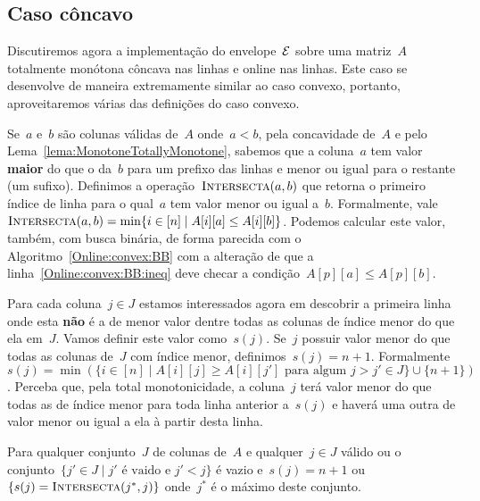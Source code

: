 
\subsection{Caso côncavo} \label{Online:concave}

Discutiremos agora a implementação do envelope~$\mathcal{E}$ sobre uma matriz~$A$ totalmente monótona côncava nas linhas e online nas linhas. Este caso se desenvolve de maneira extremamente similar ao caso convexo, portanto, aproveitaremos várias das definições do caso convexo.

Se~$a$ e~$b$ são colunas válidas de~$A$ onde~$a < b$, pela concavidade de~$A$ e pelo Lema~\ref{lema:MonotoneTotallyMonotone}, sabemos que a coluna~$a$ tem valor \textbf{maior} do que o da~$b$ para um prefixo das linhas e menor ou igual para o restante (um sufixo). Definimos a operação~$\textsc{Intersecta}(a,b)$ que retorna o primeiro índice de linha para o qual~$a$ tem valor menor ou igual a~$b$. Formalmente, vale~${\textsc{Intersecta}(a,b) = \min\{i \in [n] \mid A[i][a] \leq A[i][b]\}}$. Podemos calcular este valor, também, com busca binária, de forma parecida com o Algoritmo~\ref{Online:convex:BB} com a alteração de que a linha~\ref{Online:convex:BB:ineq} deve checar a condição~$A[p][a] \leq A[p][b]$.

Para cada coluna~$j \in J$ estamos interessados agora em descobrir a primeira linha onde esta \textbf{não} é a de menor valor dentre todas as colunas de índice menor do que ela em~$J$. Vamos definir este valor como~$s(j)$. Se~$j$ possuir valor menor do que todas as colunas de~$J$ com índice menor, definimos~$s(j) = n+1$. Formalmente~$ {s(j) = \min(\{ i \in [n] \mid A[i][j] \geq A[i][j'] \text{ para algum } j > j' \in J \} \cup \{n+1\})} $. Perceba que, pela total monotonicidade, a coluna~$j$ terá valor menor do que todas as de índice menor para toda linha anterior a~$s(j)$ e haverá uma outra de valor menor ou igual a ela à partir desta linha.

\begin{prop} \label{Online:concave:easys}
Para qualquer conjunto~$J$ de colunas de~$A$ e qualquer~$j \in J$ válido ou o conjunto~${\{j' \in J \mid j' \text{ é vaido e } j' < j\}}$ é vazio e~$s(j) = n+1$ ou~${\{s(j) = \textsc{Intersecta}(j^*,j)\}}$ onde~$j^*$ é o máximo deste conjunto.
\end{prop}

